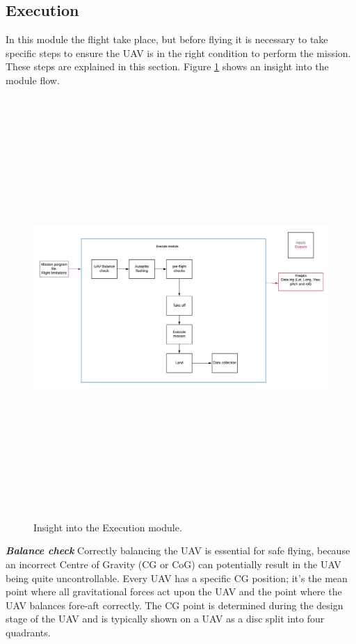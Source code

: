 \subsection{Execution}
In this module the flight take place, but before flying it is necessary to take specific steps to ensure the UAV is in the right condition to perform the mission. These steps are explained in this section.  Figure \ref{fig:execute} shows an insight into the module flow.
\begin{figure}[H]
\centering
\includegraphics[width=15cm,height=16cm,keepaspectratio]{imagenes/Execution.png}
\caption{Insight into the Execution module.}
\label{fig:execute}
\end{figure}
\textit{\textbf{Balance check}} \newline
Correctly balancing the UAV is essential for safe flying, because an incorrect Centre of Gravity (CG or CoG) can potentially result in the UAV being quite uncontrollable. Every UAV has a specific CG position; it's the mean point where all gravitational forces act upon the UAV and the point where the UAV balances fore-aft correctly. The CG point is determined during the design stage of the UAV  and is typically shown on a UAV as a disc split into four quadrants.

